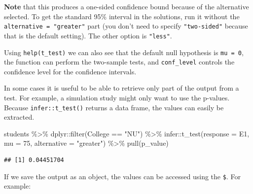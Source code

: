 \documentclass[
]{book}
\newenvironment{Shaded}{\begin{snugshade}}{\end{snugshade}}
\newcommand{\AttributeTok}[1]{\textcolor[rgb]{0.77,0.63,0.00}{#1}}
\newcommand{\DecValTok}[1]{\textcolor[rgb]{0.00,0.00,0.81}{#1}}
\newcommand{\FunctionTok}[1]{\textcolor[rgb]{0.00,0.00,0.00}{#1}}
\newcommand{\NormalTok}[1]{#1}
\newcommand{\OtherTok}[1]{\textcolor[rgb]{0.56,0.35,0.01}{#1}}
\newcommand{\SpecialCharTok}[1]{\textcolor[rgb]{0.00,0.00,0.00}{#1}}
\newcommand{\StringTok}[1]{\textcolor[rgb]{0.31,0.60,0.02}{#1}}
\begin{document}
\textbf{Note} that this produces a one-sided confidence bound because of the alternative selected. To get the standard 95\% interval in the solutions, run it without the \texttt{alternative\ =\ "greater"} part (you don't need to specify \texttt{"two-sided"} because that is the default setting). The other option is \texttt{"less"}.

Using \texttt{help(t\_test)} we can also see that the default null hypothesis is \texttt{mu\ =\ 0}, the function can perform the two-sample tests, and \texttt{conf\_level} controls the confidence level for the confidence intervals.

In some cases it is useful to be able to retrieve only part of the output from a test. For example, a simulation study might only want to use the p-values. Because \texttt{infer::t\_test()} returns a data frame, the values can easily be extracted.

\begin{Shaded}
\begin{Highlighting}[]
\NormalTok{students }\SpecialCharTok{\%\textgreater{}\%} 
\NormalTok{  dplyr}\SpecialCharTok{::}\FunctionTok{filter}\NormalTok{(College }\SpecialCharTok{==} \StringTok{"NU"}\NormalTok{) }\SpecialCharTok{\%\textgreater{}\%} 
\NormalTok{  infer}\SpecialCharTok{::}\FunctionTok{t\_test}\NormalTok{(}\AttributeTok{response =}\NormalTok{ E1, }\AttributeTok{mu =} \DecValTok{75}\NormalTok{, }\AttributeTok{alternative =} \StringTok{"greater"}\NormalTok{) }\SpecialCharTok{\%\textgreater{}\%} 
  \FunctionTok{pull}\NormalTok{(p\_value)}
\end{Highlighting}
\end{Shaded}

\begin{verbatim}
## [1] 0.04451704
\end{verbatim}

If we save the output as an object, the values can be accessed using the \texttt{\$}. For example:

\begin{Shaded}
\end{Shaded}
\end{document}

